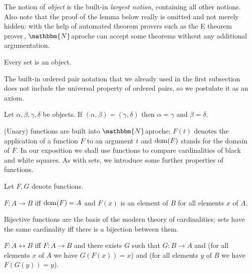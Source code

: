 \documentclass{article}
\newcommand{\Naproche}{$\mathbbm{N}$aproche}
\begin{document}
The notion of \textit{object}
is the built-in \textit{largest notion}, containing all other notions.
%
Also note that the proof of the lemma below really is omitted and not merely hidden:
with the help of automated theorem provers
such as the \textsf{E} theorem prover\,\cite{eprover}, \Naproche{}
can accept some theorems without any additional argumentation.


\begin{forthel}
    \begin{lemma}
        Every set is an object.
    \end{lemma}
\end{forthel}

The built-in ordered pair notation that we already used in the first
subsection does not include the universal property of ordered pairs,
so we postulate it as an axiom.

\begin{forthel}
    \begin{axiom}
        Let $\alpha, \beta, \gamma, \delta$ be objects.
        If $(\alpha, \beta) = (\gamma, \delta)$
        then $\alpha = \gamma$ and $\beta = \delta$.
    \end{axiom}
\end{forthel}

(Unary) functions are built into \Naproche{}; $F(t)$ denotes the
application of a function $F$ to an argument $t$ and
$\operatorname{dom}(F)$ stands for the domain of $F$. In our exposition we shall
use functions to compare cardinalities of black and white squares. As with
sets, we introduce some further properties of functions.

\begin{forthel}
    Let $F,G$ denote functions.

    \begin{definition}
        $F : A \to B$ iff $\operatorname{dom}(F) = A$ and
        $F(x)$ is an element of $B$ for all elements $x$ of $A$.
    \end{definition}
\end{forthel}

Bijective functions are the basis of the modern theory of cardinalities; sets
have the same cardinality iff there is a bijection between them.

\begin{forthel}
    \begin{definition}
        $F : A \leftrightarrow B$ iff $F : A \to B$ and there exists $G$ such that
        $G : B \to A$ and
        (for all elements $x$ of $A$ we have $G(F(x)) = x$) and
        (for all elements $y$ of $B$ we have $F(G(y)) = y$).
    \end{definition}
\end{forthel}
\end{document}
